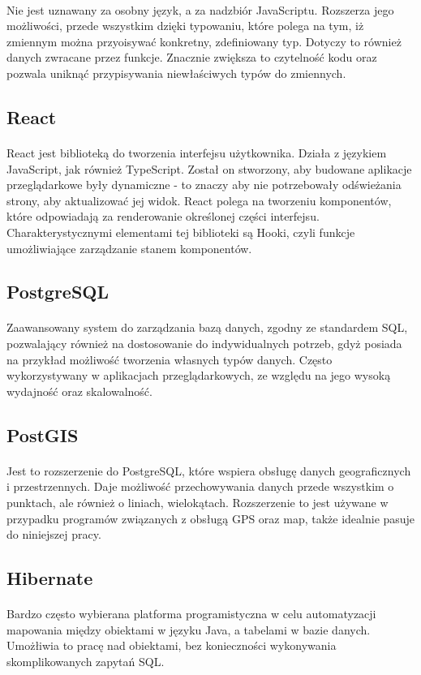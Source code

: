 \paragraph{}
Nie jest uznawany za osobny język, a za nadzbiór JavaScriptu. Rozszerza jego możliwości, przede wszystkim dzięki typowaniu, które polega na tym, iż zmiennym można przyoisywać konkretny, zdefiniowany typ. Dotyczy to również danych zwracane przez funkcje. Znacznie zwiększa to czytelność kodu oraz pozwala uniknąć przypisywania niewłaściwych typów do zmiennych.

\subsection{React}
\paragraph{}
React jest biblioteką do tworzenia interfejsu użytkownika. Działa z językiem JavaScript, jak również TypeScript. Został on stworzony, aby budowane aplikacje przeglądarkowe były dynamiczne - to znaczy aby nie potrzebowały odświeżania strony, aby aktualizować jej widok. React polega na tworzeniu komponentów, które odpowiadają za renderowanie określonej części interfejsu. Charakterystycznymi elementami tej biblioteki są Hooki, czyli funkcje umożliwiające zarządzanie stanem komponentów.

\subsection{PostgreSQL}
\paragraph{}
Zaawansowany system do zarządzania bazą danych, zgodny ze standardem SQL, pozwalający również na dostosowanie do indywidualnych potrzeb, gdyż posiada na przykład możliwość tworzenia własnych typów danych. Często wykorzystywany w aplikacjach przeglądarkowych, ze względu na jego wysoką wydajność oraz skalowalność.

\subsection{PostGIS}
\paragraph{} 
Jest to rozszerzenie do PostgreSQL, które wspiera obsługę danych geograficznych i przestrzennych. Daje możliwość przechowywania danych przede wszystkim o punktach, ale również o liniach, wielokątach. Rozszerzenie to jest używane w przypadku programów związanych z obsługą GPS oraz map, także idealnie pasuje do niniejszej pracy.

\subsection{Hibernate}
\paragraph{}
Bardzo często wybierana platforma programistyczna w celu automatyzacji mapowania między obiektami w języku Java, a tabelami w bazie danych. Umożłiwia to pracę nad obiektami, bez konieczności wykonywania skomplikowanych zapytań SQL.
